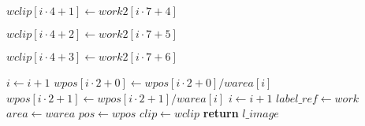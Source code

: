 \begin{algorithm}[!ht]
\begin{algorithmic}[1]
		\label{alg:arlabeling-calcregiondata-endx-start}
			\State $\mathit{wclip}\left[i \cdot 4 + 1\right] \gets \mathit{work2}\left[i \cdot 7 + 4\right]$
		\EndIf
		\label{alg:arlabeling-calcregiondata-endx-end}

		\label{alg:arlabeling-calcregiondata-y-start}
			\State $\mathit{wclip}\left[i \cdot 4 + 2\right] \gets \mathit{work2}\left[i \cdot 7 + 5\right]$
		\EndIf

			\State $\mathit{wclip}\left[i \cdot 4 + 3\right] \gets \mathit{work2}\left[i \cdot 7 + 6\right]$
		\EndIf
		\label{alg:arlabeling-calcregiondata-y-end}

		\State $i \gets i + 1$
	\EndFor
	\label{alg:arlabeling-calcregiondata-work-end}
	\label{alg:arlabeling-calcregiondata-pos-start}
		\State $\mathit{wpos}\left[i \cdot 2 + 0\right] \gets
		 \mathit{wpos}\left[i \cdot 2 + 0\right] / \mathit{warea}\left[i\right]$
		\State $\mathit{wpos}\left[i \cdot 2 + 1\right] \gets
		 \mathit{wpos}\left[i \cdot 2 + 1\right] / \mathit{warea}\left[i\right]$
		\State $i \gets i + 1$
	\EndFor
	\label{alg:arlabeling-calcregiondata-pos-end}
	\State $\mathit{label\_ref} \gets \mathit{work}$
	\State $\mathit{area} \gets \mathit{warea}$
	\State $\mathit{pos} \gets \mathit{wpos}$
	\State $\mathit{clip} \gets \mathit{wclip}$
	\State \textbf{return} $\mathit{l\_image}$
\end{algorithmic}
\end{algorithm}
